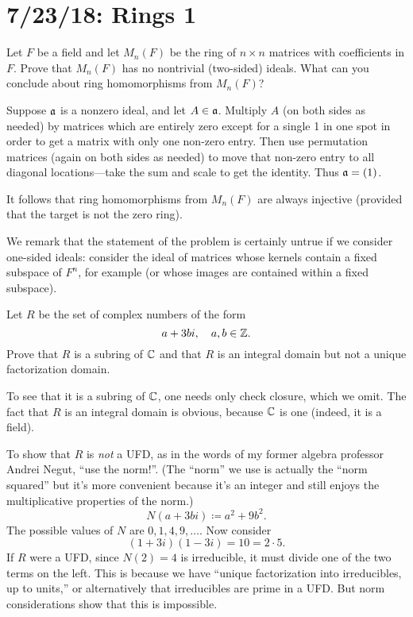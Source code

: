 \section{7/23/18: Rings 1}
\begin{problem}
	Let $F$ be a field and let $M_n(F)$ be the ring of $n\times n$ matrices with coefficients in $F$. Prove that $M_n(F)$ has no nontrivial (two-sided) ideals. What can you conclude about ring homomorphisms from $M_n(F)$?
\end{problem}
\begin{solution}
	Suppose $\mathfrak{a}$ is a nonzero ideal, and let $A\in \mathfrak{a}$. Multiply $A$ (on both sides as needed) by matrices which are entirely zero except for a single 1 in one spot in order to get a matrix with only one non-zero entry. Then use permutation matrices (again on both sides as needed) to move that non-zero entry to all diagonal locations---take the sum and scale to get the identity. Thus $\mathfrak{a} = (1)$.
	
	It follows that ring homomorphisms from $M_n(F)$ are always injective (provided that the target is not the zero ring).
	
	We remark that the statement of the problem is certainly untrue if we consider one-sided ideals: consider the ideal of matrices whose kernels contain a fixed subspace of $F^n$, for example (or whose images are contained within a fixed subspace).
\end{solution}

\begin{problem}
	Let $R$ be the set of complex numbers of the form
	\[
		a + 3bi, \quad a,b\in \mathbb{Z}.
	\]
	Prove that $R$ is a subring of $\mathbb{C}$ and that $R$ is an integral domain but not a unique factorization domain.
\end{problem}
\begin{solution}
	To see that it is a subring of $\mathbb{C}$, one needs only check closure, which we omit. The fact that $R$ is an integral domain is obvious, because $\mathbb{C}$ is one (indeed, it is a field).
	
	To show that $R$ is \emph{not} a UFD, as in the words of my former algebra professor Andrei Negut, ``use the norm!''. (The ``norm'' we use is actually the ``norm squared'' but it's more convenient because it's an integer and still enjoys the multiplicative properties of the norm.)
	\[
		N(a+3bi) \coloneqq a^2 + 9b^2.
	\]
	The possible values of $N$ are $0,1,4,9,\ldots$. Now consider
	\[
		(1 + 3i)(1 - 3i) = 10 = 2 \cdot 5.
	\]
	If $R$ were a UFD, since $N(2) = 4$ is irreducible, it must divide one of the two terms on the left. This is because we have ``unique factorization into irreducibles, up to units,'' or alternatively that irreducibles are prime in a UFD. But norm considerations show that this is impossible.
\end{solution}

